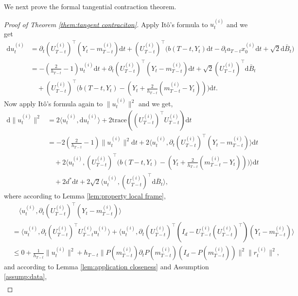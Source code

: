 \documentclass[11pt]{article}
\newcommand{\dee}{\mathrm{d}}
\newcommand{\Tr}{\mathrm{trace}}
\begin{document}
We next prove the formal tangential contraction theorem.
\begin{proof}[Proof of Theorem \ref{them:tangent contraciton}]
    Apply It\^o's formula to $u_t^{(i)}$ and we get
\begin{align*}
    \dee u_t^{(i)} & = \partial_t (U_{T-t}^{(i)})^\intercal (Y_t-m_{T-t}^{(i)}) \dee t + (U_{T-t}^{(i)})^\intercal \big( b(T-t,Y_t)\dee t - \partial_t a_{T-t}x_0^{(i)}\dee t + \sqrt{2}\dee \bar{B}_t \big) \\
    & = -(\frac{2}{h_{T-t}}-1) u_t^{(i)}\dee t + \partial_t (U_{T-t}^{(i)})^\intercal (Y_t-m_{T-t}^{(i)}) \dee t  + \sqrt{2}(U_{T-t}^{(i)})^\intercal\dee \bar{B}_t \\
    & \quad + (U_{T-t}^{(i)})^\intercal\big( b(T-t,Y_t)- ( Y_t +\frac{2}{h_{T-t}}(m_{T-t}^{(i)}-Y_t) ) \big) \dee t.
\end{align*}
Now apply It\^o's formula again to $\| u_t^{(i)} \|^2$ and we get,
\begin{align*}
    \dee \| u_t^{(i)} \|^2 & = 2\langle u_t^{(i)},\dee u_t^{(i)} \rangle + 2\Tr((U_{T-t}^{(i)})^\intercal U_{T-t}^{(i)}) \dee t \\
    & = -2(\frac{2}{h_{T-t}}-1) \|u_t^{(i)}\|^2 \dee t + 2 \langle u_t^{(i)}, \partial_t (U_{T-t}^{(i)})^\intercal (Y_t-m_{T-t}^{(i)}) \rangle \dee t \\
    &\quad + 2\langle u_t^{(i)}, (U_{T-t}^{(i)})^\intercal\big( b(T-t,Y_t)- ( Y_t +\frac{2}{h_{T-t}}(m_{T-t}^{(i)}-Y_t) ) \big)\rangle \dee t \\
    & \quad + 2d^* \dee t + 2\sqrt{2} \langle u_t^{(i)}, (U_{T-t}^{(i)})^\intercal \dee \bar{B}_t\rangle,
\end{align*}
where according to Lemma \ref{lem:property local frame},
\begin{align*}
      &\quad \langle u_t^{(i)}, \partial_t (U_{T-t}^{(i)})^\intercal (Y_t-m_{T-t}^{(i)}) \rangle \\
      & = \langle u_t^{(i)}, \partial_t (U_{T-t}^{(i)})^\intercal U_{T-t}^{(i)} u_t^{(i)} \rangle +  \langle u_t^{(i)}, \partial_t (U_{T-t}^{(i)})^\intercal (I_d - U_{T-t}^{(i)}(U_{T-t}^{(i)})^\intercal) (Y_t-m_{T-t}^{(i)}) \rangle \\
     & \le  0 + \frac{1}{h_{T-t}}\| u_t^{(i)} \|^2 + h_{T-t}\|P(m_{T-t}^{(i)}) \partial_t P(m_{T-t}^{(i)}) (I_d-P(m_{T-t}^{(i)})) \|^2 \| r_t^{(i)} \|^2,
\end{align*}
and according to Lemma \ref{lem:application closeness} and Assumption \ref{assump:data},
\begin{align*}

\end{align*}
\end{proof}
\end{document}
